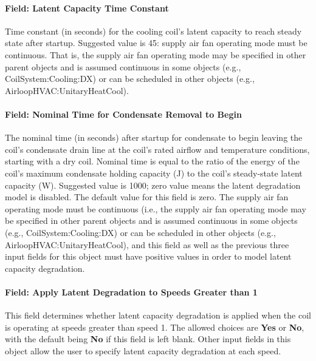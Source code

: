 \paragraph{Field: Latent Capacity Time Constant}

Time constant (in seconds) for the cooling coil's latent capacity to reach steady state after startup. Suggested value is 45: supply air fan operating mode must be continuous. That is, the supply air fan operating mode may be specified in other parent objects and is assumed continuous in some objects (e.g., CoilSystem:Cooling:DX) or can be scheduled in other objects (e.g., AirloopHVAC:UnitaryHeatCool).

\paragraph{Field: Nominal Time for Condensate Removal to Begin}

The nominal time (in seconds) after startup for condensate to begin leaving the coil's condensate drain line at the coil's rated airflow and temperature conditions, starting with a dry coil. Nominal time is equal to the ratio of the energy of the coil's maximum condensate holding capacity (J) to the coil's steady-state latent capacity (W). Suggested value is 1000; zero value means the latent degradation model is disabled. The default value for this field is zero. The supply air fan operating mode must be continuous (i.e., the supply air fan operating mode may be specified in other parent objects and is assumed continuous in some objects (e.g., CoilSystem:Cooling:DX) or can be scheduled in other objects (e.g., AirloopHVAC:UnitaryHeatCool), and this field as well as the previous three input fields for this object must have positive values in order to model latent capacity degradation.

\paragraph{Field: Apply Latent Degradation to Speeds Greater than 1}

This field determines whether latent capacity degradation is applied when the coil is operating at speeds greater than speed 1. The allowed choices are \textbf{Yes} or \textbf{No}, with the default being \textbf{No} if this field is left blank. Other input fields in this object allow the user to specify latent capacity degradation at each speed.

